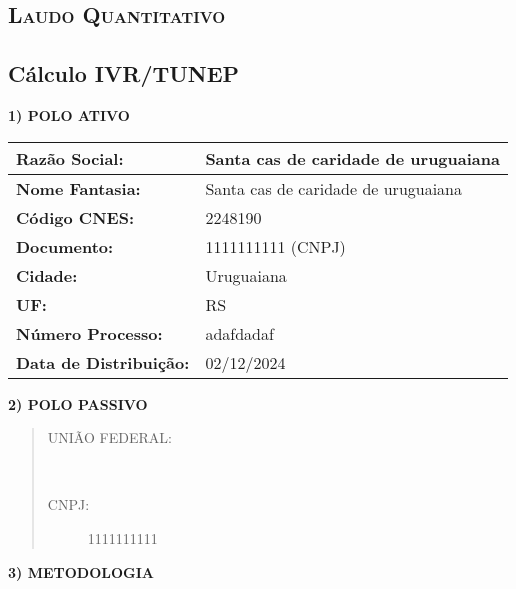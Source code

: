 \documentclass{article}
\begin{document}
    \pagestyle{empty}

    \begin{center}
    \section*{\fontsize{40}{19}\bfseries\scshape Laudo Quantitativo}
    \subsection*{\fontsize{25}{17}\bfseries Cálculo IVR/TUNEP}
    \end{center}

    \vspace{10mm}

    \LARGE
    \textbf{1) POLO ATIVO}

    \begin{tabular}{l l}
    \hline
    \textbf{Razão Social:} & Santa cas de caridade de uruguaiana \\
    \hline
    \textbf{Nome Fantasia:} & Santa cas de caridade de uruguaiana \\
    \hline
    \textbf{Código CNES:} & 2248190 \\
    \hline
    \textbf{Documento:} & 1111111111 (CNPJ) \\
    \hline
    \textbf{Cidade:} & Uruguaiana \\
    \hline
    \textbf{UF:} & RS \\
    \hline
    \textbf{Número Processo:} & adafdadaf \\
    \hline
    \textbf{Data de Distribuição:} & 02/12/2024 \\
    \hline
    \end{tabular}

    \vspace{10mm}

    \textbf{2) POLO PASSIVO}
    \begin{quote}
    \begin{description}
    \item[UNIÃO FEDERAL:]  \
    \item[CNPJ:] 1111111111 \
    \end{description}
    \end{quote}

    \vspace{10mm}

    \textbf{3) METODOLOGIA}
\end{document}
